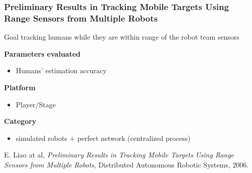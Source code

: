 \begin{frame}
	\frametitle{Preliminary Results in Tracking Mobile Targets Using Range Sensors from Multiple Robots}
	
	\normalsize
	
	\vspace{0.3cm}
	
	\begin{block}{Goal}
		tracking humans while they are within range of the robot team sensors
	\end{block}
	
	\vspace{0.15cm}
	
	\textbf{Parameters evaluated}
	
	\begin{itemize}
		\item Humans' estimation accuracy
	\end{itemize}
	
	\textbf{Platform}
	
	\begin{itemize}
		\item Player/Stage
	\end{itemize}
	
	\textbf{Category}
	
	\begin{itemize}
		\item simulated robots + perfect network (centralized process)
	\end{itemize}
	
	\vspace{-4cm}
	
	\begin{tabbing}
		\hspace{7cm}
		
	\end{tabbing}
	
	\vspace{0.9cm}
	
	\tiny
	E. Liao at al, \emph{Preliminary Results in Tracking Mobile Targets Using Range Sensors from Multiple Robots},
	\vspace{-0.35cm}
	Distributed Autonomous Robotic Systems, 2006.
\end{frame}

